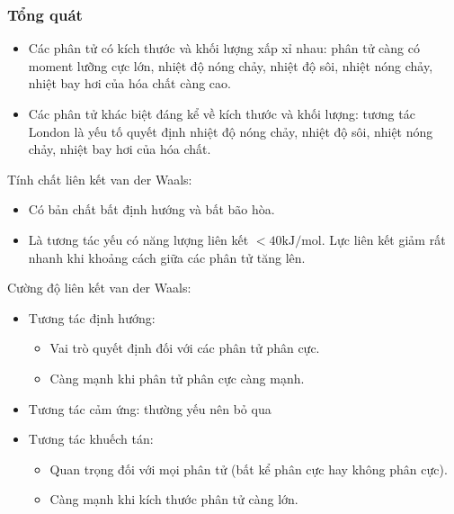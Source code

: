 \subsubsection{Tổng quát}
\begin{itemize}
\item Các phân tử có kích thước và khối lượng xấp xỉ nhau: phân tử càng có moment lưỡng cực lớn, nhiệt độ nóng chảy, nhiệt độ sôi, nhiệt nóng chảy, nhiệt bay hơi của hóa chất càng cao.
\item Các phân tử khác biệt đáng kể về kích thước và khối lượng: tương tác London là yếu tố quyết định nhiệt độ nóng chảy, nhiệt độ sôi, nhiệt nóng chảy, nhiệt bay hơi của hóa chất.
\end{itemize}
Tính chất liên kết van der Waals:
\begin{itemize}
\item Có bản chất bất định hướng và bất bão hòa.
\item Là tương tác yếu có năng lượng liên kết $< 40 \mathrm{kJ/mol}.$ Lực liên kết giảm rất nhanh khi khoảng cách giữa các phân tử tăng lên.
\end{itemize}
Cường độ liên kết van der Waals:
\begin{itemize}
\item Tương tác định hướng:
\begin{itemize}
\item Vai trò quyết định đối với các phân tử phân cực.
\item Càng mạnh khi phân tử phân cực càng mạnh.
\end{itemize}
\item Tương tác cảm ứng: thường yếu nên bỏ qua
\item Tương tác khuếch tán:
\begin{itemize}
\item Quan trọng đối với mọi phân tử (bất kể phân cực hay không phân cực).
\item Càng mạnh khi kích thước phân tử càng lớn.
\end{itemize}
\end{itemize}
